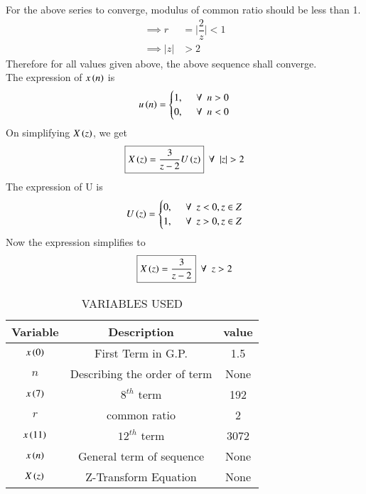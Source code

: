 \documentclass[journal,12pt,twocolumn]{IEEEtran}
\theoremstyle{remark}
\begin{document}
For the above series to converge, modulus of common ratio should be less than 1.
\begin{align}
\implies r &= \bigg|\dfrac{2}{z}\bigg|<1\\
 \implies       |z|&> 2
\end{align}
Therefore for all values given above, the above sequence shall converge.\\
The expression of $x\left(n\right)$ is 
\[
u\left(n\right)=
\begin{cases}
    1,&\,\,\,\forall\,\,\,n>0\\
    0,&\,\,\,\forall\,\,\,n<0
\end{cases}
\]
On simplifying $X\left(z\right)$, we get
\begin{align}
\boxed{X\brak{z}=\dfrac{3}{z-2}U\brak{z}}\,\,\,  \forall \,\,\, |z|>2 
\end{align}
The expression of U is 
\[
U\left(z\right)=
\begin{cases}
    0,&\,\,\,\forall\,\,\,z<0,z \in Z\\
    1,&\,\,\,\forall\,\,\,z>0,z \in Z
\end{cases}
\]
Now the expression simplifies to
\begin{align}
   \boxed{X\left(z\right)=\dfrac{3}{z-2}}\,\,\, \forall \,\,\, z>2
\end{align}
\begin{table}[ht]
\renewcommand\thetable{1} 
    \centering
    \begin{tabular}{|c|c|c|}
    \hline
        Variable&Description&value\\\hline
        $x\left(0\right)$&First Term in G.P.&1.5\\\hline
        $n$&Describing the order of term&None\\\hline
        $x\left(7\right)$&$8^{th}$ term&192\\\hline
        $r$&common ratio&2\\\hline
        $x\left(11\right)$&$12^{th}$ term&3072\\\hline
        $x\left(n\right)$&General term of sequence&None\\\hline
        $X\left(z\right)$&Z-Transform Equation&None\\\hline
    \end{tabular}
    \vspace{0.3cm}
    \caption{VARIABLES USED}
    \label{tab:my_label}
\end{table}
\end{document}
